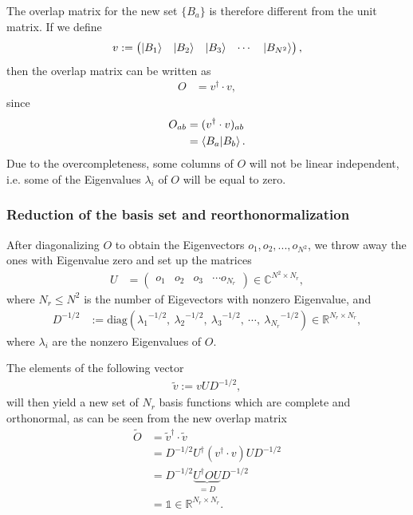 \documentclass[12pt,a4paper]{scrartcl}
\numberwithin{equation}{section}
\newcommand{\unity}{\mathds{1}}
\begin{document}
The overlap matrix for the new set $\{ B_a \}$ is therefore different from the unit matrix.
If we define 
\begin{align}
 v := 
 \begin{pmatrix}
\ket{B_1} & \ket{B_2} & \ket{B_3}& \cdots & \ket{B_{N^2}}  
 \end{pmatrix},
\end{align}
then the overlap matrix can be written as
\begin{align}
O &= v^{\dagger}\cdot v,
\end{align}
since
\begin{align}
O_{ab} &= (v^{\dagger}\cdot v)_{ab} \\
 &= \braket{B_a | B_b} .
\end{align}
Due to the overcompleteness, some columns of $O$ will not be linear independent, i.e. some of the Eigenvalues 
$\lambda_i$ of $O$ will be equal to zero.

\subsubsection{Reduction of the basis set and reorthonormalization}

After diagonalizing $O$ to obtain the Eigenvectors $o_1,o_2,...,o_{N^2}$, we throw away the ones with Eigenvalue zero 
and set up the matrices
\begin{align}
 U &=
 \begin{pmatrix}
  o_1 & o_2 & o_3 & \cdots o_{N_r}
 \end{pmatrix} \in \mathbb{C}^{N^2 \times N_r},
\end{align}
where $N_r \leq N^2$ is the number of Eigevectors with nonzero Eigenvalue,
and
\begin{align}
 D^{-1/2} &:= \mathrm{diag}( {\lambda_1}^{-1/2}, \ {\lambda_2}^{-1/2}, \ {\lambda_3}^{-1/2}, \ \cdots,\ {\lambda_{N_r}}^{-1/2}  ) 
 \in \mathbb{R}^{N_r \times N_r},
\end{align}
where $\lambda_i$ are the nonzero Eigenvalues of $O$.


The elements of the following vector
\begin{align}
\tilde{v} := vUD^{-1/2} ,
\end{align}
will then yield a new set of $N_r$ basis functions which are complete and orthonormal, as can be seen from
the new overlap matrix
\begin{align}
\tilde{O} &= \tilde{v}^{\dagger}\cdot \tilde{v} \\
&= D^{-1/2}U^{\dagger} (v^{\dagger} \cdot v) UD^{-1/2} \\
&= D^{-1/2} \underbrace{U^{\dagger} O U}_{=D} D^{-1/2} \\
&= \unity  \in \mathbb{R}^{N_r \times N_r}.
\end{align}
\end{document}
